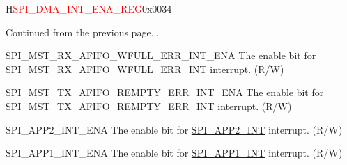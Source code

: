 \addtocounter{Regfloat}{-1}
\begin{register}{H}{\textcolor{red}{SPI\_DMA\_INT\_ENA\_REG}}{0x{}0034}
\begin{regdesc}\begin{reglist}
\item [Continued from the previous page...]
\label{fielddesc:SPIMSTRXAFIFOWFULLERRINTENA}\item [SPI\_MST\_RX\_AFIFO\_WFULL\_ERR\_INT\_ENA] The enable bit for \hyperref[int:SPIMSTRXAFIFOWFULLERRINT]{SPI\_MST\_RX\_AFIFO\_WFULL\_ERR\_INT} interrupt. (R/W)
\label{fielddesc:SPIMSTTXAFIFOREMPTYERRINTENA}\item [SPI\_MST\_TX\_AFIFO\_REMPTY\_ERR\_INT\_ENA] The enable bit for \hyperref[int:SPIMSTTXAFIFOREMPTYERRINT]{SPI\_MST\_TX\_AFIFO\_REMPTY\_ERR\_INT} interrupt. (R/W)
\label{fielddesc:SPIAPP2INTENA}\item [SPI\_APP2\_INT\_ENA] The enable bit for \hyperref[int:SPIAPP2INT]{SPI\_APP2\_INT} interrupt. (R/W)
\label{fielddesc:SPIAPP1INTENA}\item [SPI\_APP1\_INT\_ENA] The enable bit for \hyperref[int:SPIAPP1INT]{SPI\_APP1\_INT} interrupt. (R/W)
\end{reglist}\end{regdesc}
\end{register}


